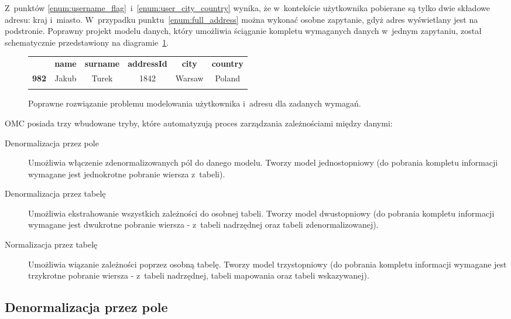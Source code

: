 Z~punktów \ref{enum:username_flag}~i~\ref{enum:user_city_country} wynika, że w~kontekście użytkownika pobierane są tylko dwie składowe adresu: kraj i~miasto. W~przypadku punktu~\ref{enum:full_address} można wykonać osobne zapytanie, gdyż adres wyświetlany jest na podstronie. Poprawny projekt modelu danych, który umożliwia ściąganie kompletu wymaganych danych w~jednym zapytaniu, został schematycznie przedstawiony na diagramie~\ref{tab:address_denormalization_example}.

\begin{figure}[ht!]
	\centering

	\begin{tabular}{|l||c|c|c|c|c|}
		\hhline{|-||-----|}
		 & \textbf{name} & \textbf{surname} & \textbf{addressId} & \textbf{city} & \textbf{country} \\
		\hhline{|~||=====|}
		\textbf{982} & Jakub & Turek & 1842 & Warsaw & Poland \\
		\hhline{|-||-----|}
	\end{tabular} 

	\caption{Poprawne rozwiązanie problemu modelowania użytkownika i~adresu dla zadanych wymagań.}
	\label{tab:address_denormalization_example}
\end{figure}

OMC posiada trzy wbudowane tryby, które automatyzują proces zarządzania zależnościami między danymi:

\begin{description}
	\item[Denormalizacja przez pole] Umożliwia włączenie zdenormalizowanych pól do danego modelu. Tworzy model jednostopniowy (do pobrania kompletu informacji wymagane jest jednokrotne pobranie wiersza z~tabeli).
	\item[Denormalizacja przez tabelę] Umożliwia ekstrahowanie wszystkich zależności do osobnej tabeli. Tworzy model dwustopniowy (do pobrania kompletu informacji wymagane jest dwukrotne pobranie wiersza - z~tabeli nadrzędnej oraz tabeli zdenormalizowanej).
	\item[Normalizacja przez tabelę] Umożliwia wiązanie zależności poprzez osobną tabelę. Tworzy model trzystopniowy (do pobrania kompletu informacji wymagane jest trzykrotne pobranie wiersza - z~tabeli nadrzędnej, tabeli mapowania oraz tabeli wskazywanej).
\end{description}

\subsection{Denormalizacja przez pole}

